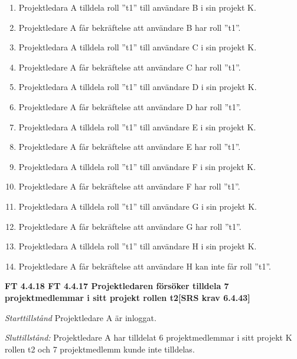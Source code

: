 \documentclass[a4paper]{article}
\begin{document}
\begin{enumerate}
\item Projektledara A tilldela roll ”t1” till användare B i sin projekt K. 
\item Projektledare A får bekräftelse att användare B har roll ”t1”.
\item Projektledara A tilldela roll ”t1” till användare C i sin projekt K. 
\item Projektledare A får bekräftelse att användare C har roll ”t1”.
\item Projektledara A tilldela roll ”t1” till användare D i sin projekt K. 
\item Projektledare A får bekräftelse att användare D har roll ”t1”.
\item Projektledara A tilldela roll ”t1” till användare E i sin projekt K. 
\item Projektledare A får bekräftelse att användare E har roll ”t1”.
\item Projektledara A tilldela roll ”t1” till användare F i sin projekt K.
\item Projektledare A får bekräftelse att användare F har roll ”t1”.
\item Projektledara A tilldela roll ”t1” till användare G i sin projekt K. 
\item Projektledare A får bekräftelse att användare G har roll ”t1”.
\item Projektledara A tilldela roll ”t1” till användare H i sin projekt K. 
\item Projektledare A får bekräftelse att användare H kan inte får roll ”t1”.
\end{enumerate}

\textbf{FT 4.4.18 FT 4.4.17 Projektledaren försöker tilldela 7 projektmedlemmar i sitt projekt rollen t2[SRS krav 6.4.43]}

\emph{Starttillstånd} Projektledare A är inloggat.

\emph{Sluttillstånd:} Projektledare A  har tilldelat 6 projektmedlemmar i sitt projekt K  rollen t2 och 7 projektmedlemm kunde inte tilldelas.
\end{document}
